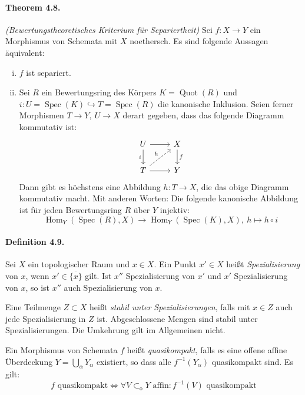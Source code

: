 \documentclass[11pt,b5paper,openany]{memoir}
\begin{document}
\paragraph{Theorem 4.8.}\label{4.8} \textit{(Bewertungstheoretisches Kriterium für Separiertheit)} Sei $f:X\to Y$ ein Morphismus von Schemata mit $X$ noethersch. Es sind folgende Aussagen äquivalent:
\begin{enumerate}[(i)]
\item $f$ ist separiert.
\item Sei $R$ ein Bewertungsring des Körpers $K=\operatorname{Quot}(R)$ und $i:U=\operatorname{Spec}(K)\hookrightarrow T=\operatorname{Spec}(R)$ die kanonische Inklusion. Seien ferner Morphismen $T\to Y,\ U\to X$ derart gegeben, dass das folgende Diagramm kommutativ ist:
\[\begin{tikzcd}
U\ar[r]\ar[d, "i"'] & X\ar[d, "f"]\\
T\ar[r]\ar[ur, "h", dashed] & Y
\end{tikzcd}\]
Dann gibt es höchstens eine Abbildung $h:T\to X$, die das obige Diagramm kommutativ macht. Mit anderen Worten: Die folgende kanonische Abbildung ist für jeden Bewertungsring $R$ über $Y$ injektiv:
\[\operatorname{Hom}_Y(\operatorname{Spec}(R),X)\to\operatorname{Hom}_Y(\operatorname{Spec}(K),X),\ h\mapsto h\circ i \]
\end{enumerate}

\paragraph{Definition 4.9.}\label{4.9}  Sei $X$ ein topologischer Raum und $x\in X$. Ein Punkt $x'\in X$ heißt \textit{Spezialisierung} von $x$, wenn $x'\in\overline{\{x\}}$ gilt. Ist $x''$ Spezialisierung von $x'$ und $x'$ Spezialisierung von $x$, so ist $x''$ auch Spezialisierung von $x$.

Eine Teilmenge $Z\subset X$ heißt \textit{stabil unter Spezialisierungen}, falls mit $x\in Z$ auch jede Spezialisierung in $Z$ ist. Abgeschlossene Mengen sind stabil unter Spezialisierungen. Die Umkehrung gilt im Allgemeinen nicht.

Ein Morphismus von Schemata $f$ heißt \textit{quasikompakt}, falls es eine offene affine Ü\-ber\-deckung $Y=\bigcup_\alpha Y_\alpha$ existiert, so dass alle $f^{-1}(Y_\alpha)$ quasikompakt sind. Es gilt:
\[f\text{ quasikompakt}\iff\forall V\subset_\text{o}Y\text{ affin}\colon f^{-1}(V)\text{ quasikompakt} \]
\end{document}
